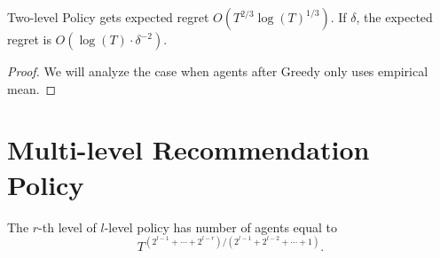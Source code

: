 \documentclass[11pt]{article}
\def\ALGG{Greedy }
\def\2LEVEL{Two-level Policy}
\begin{document}
\begin{theorem}
\2LEVEL gets expected regret $O(T^{2/3} \log(T)^{1/3})$. If $\delta$, the expected regret is $O(\log(T) \cdot \delta^{-2})$. 
\end{theorem}

\begin{proof}
We will analyze the case when agents after \ALGG only uses empirical mean.
\end{proof}

\section{Multi-level Recommendation Policy}
The $r$-th level of $l$-level policy has number of agents equal to
\[
T^{(2^{l-1}+\cdots+2^{l-r})/(2^{l-1}+2^{l-2}+\cdots + 1)}.
\]
\end{document}
